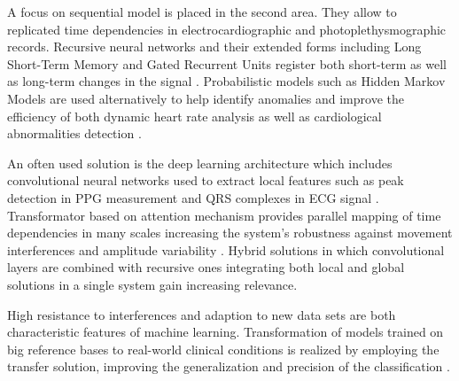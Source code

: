 \documentclass[journal]{IEEEtran}
\begin{document}
A focus on sequential model is placed in the second area. They allow to replicated time dependencies in electrocardiographic and photoplethysmographic records.
Recursive neural networks and their extended forms including Long Short-Term Memory and Gated Recurrent Units register both short-term as well as long-term changes in the signal \cite{12}. Probabilistic models such as Hidden Markov Models are used alternatively to help identify anomalies and improve the efficiency of both dynamic heart rate analysis as well as cardiological abnormalities detection \cite{13}.

\newpage
An often used solution is the deep learning architecture which includes convolutional neural networks used to extract local features such as peak detection in PPG measurement and QRS complexes in ECG signal \cite{14}. Transformator based on attention mechanism provides parallel mapping of time dependencies in many scales increasing the system's robustness against movement interferences and amplitude variability \cite{15}. Hybrid solutions in which convolutional layers are combined with recursive ones integrating both local and global solutions in a single system gain increasing relevance.


High resistance to interferences and adaption to new data sets are both characteristic features of machine learning. Transformation of models trained on big reference bases to real-world clinical conditions is realized by employing the transfer solution, improving the generalization and precision of the classification \cite{16}.
\end{document}
